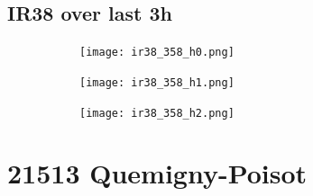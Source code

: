 \documentclass{article}
\begin{document}
\vspace{-1em}
\subsection*{IR38 over last 3h}
\vspace{-1em}
\begin{figure}[H]
    \centering
    \begin{subfigure}[b]{0.32\textwidth}
        \centering
        \texttt{[image: ir38\_358\_h0.png]} %
    \end{subfigure}
    \begin{subfigure}[b]{0.32\textwidth}
        \centering
        \texttt{[image: ir38\_358\_h1.png]} %
    \end{subfigure}
    \begin{subfigure}[b]{0.32\textwidth}
        \centering
        \texttt{[image: ir38\_358\_h2.png]} %
    \end{subfigure}
\end{figure}

\vspace{-1em}
\section*{21513 Quemigny-Poisot}
\vspace{-1em}
\end{document}

